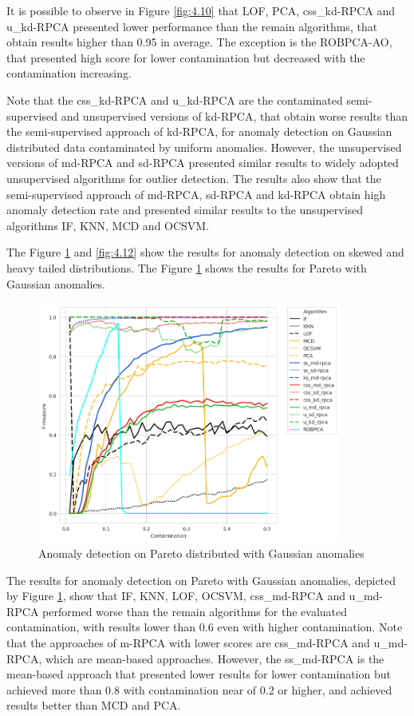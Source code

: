 It is possible to observe in Figure \ref{fig:4.10} that LOF, PCA, css\_kd-RPCA and u\_kd-RPCA presented lower performance than the remain algorithms, that obtain results higher than 0.95 in average. The exception is the ROBPCA-AO, that presented high score for lower contamination but decreased with the contamination increasing. 

Note that the css\_kd-RPCA and u\_kd-RPCA are the contaminated semi-supervised and unsupervised versions of kd-RPCA, that obtain worse results than the semi-supervised approach of kd-RPCA, for anomaly detection on Gaussian distributed data contaminated by uniform anomalies. However, the unsupervised versions of md-RPCA and sd-RPCA presented similar results to widely adopted unsupervised algorithms for outlier detection. The results also show that the semi-supervised approach of md-RPCA, sd-RPCA and kd-RPCA obtain high anomaly detection rate and presented similar results to the unsupervised algorithms IF, KNN, MCD and OCSVM. 

The Figure \ref{fig:4.11} and \ref{fig:4.12} show the results for anomaly detection on skewed and heavy tailed distributions. The Figure \ref{fig:4.11} shows the results for Pareto with Gaussian anomalies.

\begin{figure}[h!]
	\centering
	\includegraphics[width=10cm]{figures/ch4/pareto_f1_contamination.png}
	\caption{Anomaly detection on Pareto distributed with Gaussian anomalies}
	\label{fig:4.11}
\end{figure}

The results for anomaly detection on Pareto with Gaussian anomalies, depicted by Figure \ref{fig:4.11}, show that IF, KNN, LOF, OCSVM, css\_md-RPCA and u\_md-RPCA performed worse than the remain algorithms for the evaluated contamination, with results lower than 0.6 even with higher contamination. Note that the approaches of m-RPCA with lower scores are css\_md-RPCA and u\_md-RPCA, which are mean-based approaches. However, the ss\_md-RPCA is the mean-based approach that presented lower results for lower contamination but achieved more than 0.8 with contamination near of 0.2 or higher, and achieved results better than MCD and PCA.

